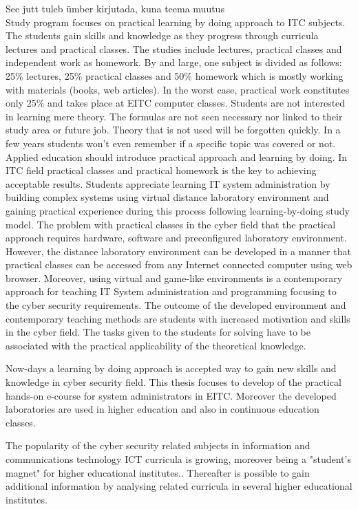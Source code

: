 {\color{red} See jutt tuleb ümber kirjutada, kuna teema muutus}\\
Study program focuses on practical learning by doing approach to ITC subjects. The students gain skills and knowledge as they progress through curricula lectures and practical classes. The studies include lectures, practical classes and independent work as homework. By and large, one subject is divided as follows: 25\% lectures, 25\% practical classes and 50\% homework which is mostly working with materials (books, web articles). In the worst case, practical work constitutes only 25\% and takes place at \gls{EITC} computer classes. Students are not interested in learning mere theory. The formulas are not seen necessary nor linked to their study area or future job. Theory that is not used will be forgotten quickly. In a few years students won't even remember if a specific topic was covered or not. Applied education should introduce practical approach and learning by doing. In ITC field practical classes and practical homework is the key to achieving acceptable results. Students appreciate learning IT system administration by building complex systems using virtual distance laboratory environment and gaining practical experience during this process following learning-by-doing study model.
The problem with practical classes in the cyber field that the practical approach requires hardware, software and preconfigured laboratory environment. However, the  distance laboratory environment can be developed in a manner  that practical classes can be accessed from any Internet connected computer using web browser. Moreover, using virtual and game-like environments is a contemporary approach for teaching IT System administration and programming focusing to the cyber security requirements. The outcome of the developed environment and contemporary teaching methods are students with increased motivation and skills in the cyber field. The tasks given to the students for solving have to be associated with the practical applicability of the theoretical knowledge.






Now-days a learning by doing approach is accepted way to gain new skills and knowledge in cyber security field. This thesis focuses to develop of the practical hands-on e-course for system administrators in \gls{EITC}. Moreover the developed laboratories are used in higher education and also in continuous education classes.


The popularity of the cyber security related subjects in information and communications technology \gls{ICT} curricula is growing, moreover being a "student's magnet" for higher educational institutes.\citep{CyberIsHot}. Thereafter is possible to gain additional information by analysing related curricula in several higher educational institutes.

